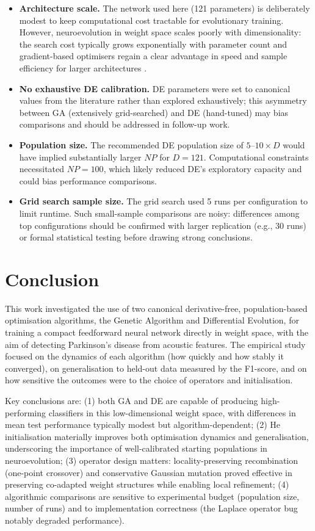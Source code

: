 \documentclass[12pt, a4paper]{article}
\begin{document}
\begin{itemize}
  \item \textbf{Architecture scale.} The network used here (121 parameters) is deliberately modest to keep computational cost tractable for evolutionary training. However, neuroevolution in weight space scales poorly with dimensionality: the search cost typically grows exponentially with parameter count and gradient-based optimisers regain a clear advantage in speed and sample efficiency for larger architectures \cite{yao1999}.
  \item \textbf{No exhaustive DE calibration.} DE parameters were set to canonical values from the literature rather than explored exhaustively; this asymmetry between GA (extensively grid-searched) and DE (hand-tuned) may bias comparisons and should be addressed in follow-up work.
  \item \textbf{Population size.} The recommended DE population size of $5$--$10\times D$ would have implied substantially larger $NP$ for $D=121$. Computational constraints necessitated $NP=100$, which likely reduced DE's exploratory capacity and could bias performance comparisons.
  \item \textbf{Grid search sample size.} The grid search used 5 runs per configuration to limit runtime. Such small-sample comparisons are noisy: differences among top configurations should be confirmed with larger replication (e.g., 30 runs) or formal statistical testing before drawing strong conclusions.
\end{itemize}

\section{Conclusion}

This work investigated the use of two canonical derivative-free, population-based optimisation algorithms, the Genetic Algorithm and Differential Evolution, for training a compact feedforward neural network directly in weight space, with the aim of detecting Parkinson's disease from acoustic features. The empirical study focused on the dynamics of each algorithm (how quickly and how stably it converged), on generalisation to held-out data measured by the F1-score, and on how sensitive the outcomes were to the choice of operators and initialisation.

Key conclusions are: (1) both GA and DE are capable of producing high-performing classifiers in this low-dimensional weight space, with differences in mean test performance typically modest but algorithm-dependent; (2) He initialisation materially improves both optimisation dynamics and generalisation, underscoring the importance of well-calibrated starting populations in neuroevolution; (3) operator design matters: locality-preserving recombination (one-point crossover) and conservative Gaussian mutation proved effective in preserving co-adapted weight structures while enabling local refinement; (4) algorithmic comparisons are sensitive to experimental budget (population size, number of runs) and to implementation correctness (the Laplace operator bug notably degraded performance).
\end{document}
